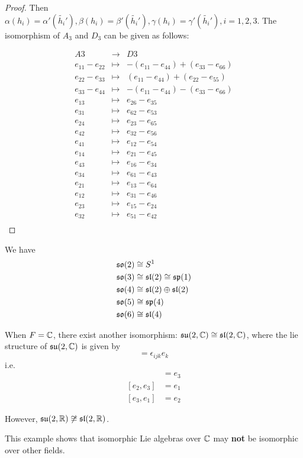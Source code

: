 \begin{proof}
  Then $\alpha(h_i) = \alpha'(\tilde{h_i}'), \beta(h_i) = \beta'(\tilde{h_i}'),\gamma(h_i) = \gamma'(\tilde{h_i}'), i = 1,2,3$. The isomorphism of $A_3$ and $D_3$ can be given as follows:

  \begin{equation*}
    \begin{array}{ccc}
      A3 &\to& D3 \\
e_{11} - e_{22} &\mapsto& -(e_{11} - e_{44}) + (e_{33} - e_{66}) \\
e_{22} - e_{33} &\mapsto& (e_{11} - e_{44}) + (e_{22} - e_{55}) \\
e_{33} - e_{44} &\mapsto& -(e_{11} - e_{44}) - (e_{33} - e_{66}) \\
e_{13} &\mapsto& e_{26} - e_{35} \\
e_{31} &\mapsto& e_{62} - e_{53} \\
e_{24} &\mapsto& e_{23} - e_{65} \\
e_{42} &\mapsto& e_{32} - e_{56} \\
e_{41} &\mapsto& e_{12} - e_{54} \\
e_{14} &\mapsto& e_{21} - e_{45} \\
e_{43} &\mapsto& e_{16} - e_{34} \\
e_{34} &\mapsto& e_{61} - e_{43} \\
e_{21} &\mapsto& e_{13} - e_{64} \\
e_{12} &\mapsto& e_{31} - e_{46} \\
e_{23} &\mapsto& e_{15} - e_{24} \\
e_{32} &\mapsto& e_{51} - e_{42} \\
    \end{array}
  \end{equation*}
\end{proof}
\begin{rem}
  We have
  \begin{align*}
    \mathfrak{s}\mathfrak{o}(2) &\cong S^1 \\
    \mathfrak{s}\mathfrak{o}(3) &\cong \mathfrak{s}\mathfrak{l}(2) \cong \mathfrak{s}\mathfrak{p}(1) \\
    \mathfrak{s}\mathfrak{o}(4) &\cong \mathfrak{s}\mathfrak{l}(2)\oplus\mathfrak{s}\mathfrak{l}(2) \\
    \mathfrak{s}\mathfrak{o}(5) &\cong \mathfrak{s}\mathfrak{p}(4) \\
    \mathfrak{s}\mathfrak{o}(6) &\cong \mathfrak{s}\mathfrak{l}(4)
  \end{align*}
\end{rem}
\begin{rem}
  When $F={\mathbb C}$, there exist another isomorphism: $\mathfrak{s}\mathfrak{u}(2,{\mathbb C})\cong\mathfrak{s}\mathfrak{l}(2,{\mathbb C})$, where the lie structure of $\mathfrak{s}\mathfrak{u}(2,{\mathbb C})$ is given by
  \begin{equation*}
    [e_i,e_j]=\epsilon_{ijk}e_k
  \end{equation*}
  i.e.
  \begin{align*}
    [e_1,e_2] & =e_3 \\
    [e_2,e_3] & =e_1 \\
    [e_3,e_1] & =e_2
  \end{align*}

  However, $\mathfrak{s}\mathfrak{u}(2,{\mathbb R})\not\cong\mathfrak{s}\mathfrak{l}(2,{\mathbb R})$.

  This example shows that isomorphic Lie algebras over ${\mathbb C}$ may \textbf{not} be isomorphic over other fields.
\end{rem}

